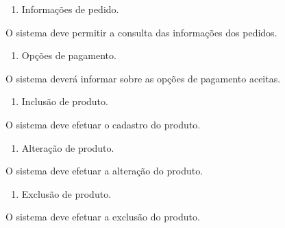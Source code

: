 \liststyleWWNumi
\setcounter{saveenum}{\value{enumi}}
\begin{enumerate}
\setcounter{enumi}{\value{saveenum}}
\item {
\textcolor[rgb]{0.078431375,0.09411765,0.13725491}{Informações de pedido.}}
\end{enumerate}
{
\textcolor[rgb]{0.078431375,0.09411765,0.13725491}{O sistema deve permitir a consulta das informações dos pedidos.}}

\liststyleWWNumi
\setcounter{saveenum}{\value{enumi}}
\begin{enumerate}
\setcounter{enumi}{\value{saveenum}}
\item {
\textcolor[rgb]{0.078431375,0.09411765,0.13725491}{Opções de pagamento.}}
\end{enumerate}
{
\textcolor[rgb]{0.078431375,0.09411765,0.13725491}{O sistema deverá informar sobre as opções de pagamento aceitas.}}


\bigskip


\bigskip

\liststyleWWNumi
\setcounter{saveenum}{\value{enumi}}
\begin{enumerate}
\setcounter{enumi}{\value{saveenum}}
\item {
\textcolor[rgb]{0.078431375,0.09411765,0.13725491}{Inclusão de produto.}}
\end{enumerate}
{
\textcolor[rgb]{0.078431375,0.09411765,0.13725491}{O sistema deve efetuar o cadastro do produto.}}

\liststyleWWNumi
\setcounter{saveenum}{\value{enumi}}
\begin{enumerate}
\setcounter{enumi}{\value{saveenum}}
\item {
\textcolor[rgb]{0.078431375,0.09411765,0.13725491}{Alteração de produto.}}
\end{enumerate}
{
\textcolor[rgb]{0.078431375,0.09411765,0.13725491}{O sistema deve efetuar a alteração do produto.}}

\liststyleWWNumi
\setcounter{saveenum}{\value{enumi}}
\begin{enumerate}
\setcounter{enumi}{\value{saveenum}}
\item {
\textcolor[rgb]{0.078431375,0.09411765,0.13725491}{Exclusão de produto.}}
\end{enumerate}
{
\textcolor[rgb]{0.078431375,0.09411765,0.13725491}{O sistema deve efetuar a exclusão do produto.}}

